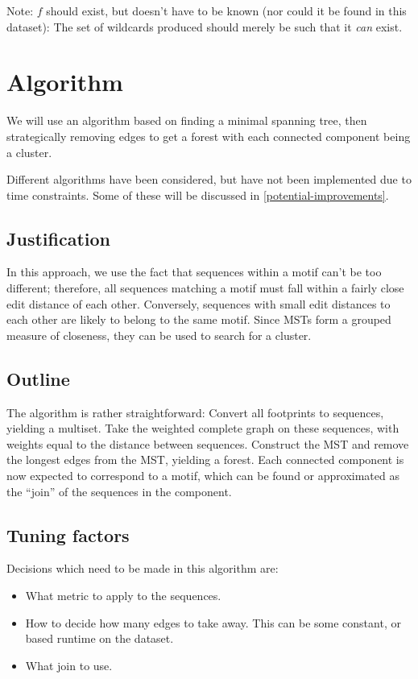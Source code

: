 \documentclass[fleqn]{book}
\providecommand{\tightlist}{%
  \setlength{\itemsep}{0pt}\setlength{\parskip}{0pt}}
\begin{document}
Note: \(f\) should exist, but doesn't have to be known (nor could it be
found in this dataset): The set of wildcards produced should merely be
such that it \emph{can} exist.

\chapter{Algorithm}\label{algorithm}

We will use an algorithm based on finding a minimal spanning tree, then
strategically removing edges to get a forest with each connected
component being a cluster.

Different algorithms have been considered, but have not been implemented
due to time constraints. Some of these will be discussed in
\autoref{potential-improvements}.

\section{Justification}\label{justification}

In this approach, we use the fact that sequences within a motif can't be
too different; therefore, all sequences matching a motif must fall
within a fairly close edit distance of each other. Conversely, sequences
with small edit distances to each other are likely to belong to the same
motif. Since MSTs form a grouped measure of closeness, they can be used
to search for a cluster.

\section{Outline}\label{outline}

The algorithm is rather straightforward: Convert all footprints to
sequences, yielding a multiset. Take the weighted complete graph on
these sequences, with weights equal to the distance between sequences.
Construct the MST and remove the longest edges from the MST, yielding a
forest. Each connected component is now expected to correspond to a
motif, which can be found or approximated as the ``join'' of the
sequences in the component.

\section{Tuning factors}\label{tuning-factors}

Decisions which need to be made in this algorithm are:

\begin{itemize}
\tightlist
\item
  What metric to apply to the sequences.
\item
  How to decide how many edges to take away. This can be some constant,
  or based runtime on the dataset.
\item
  What join to use.
\end{itemize}
\end{document}

